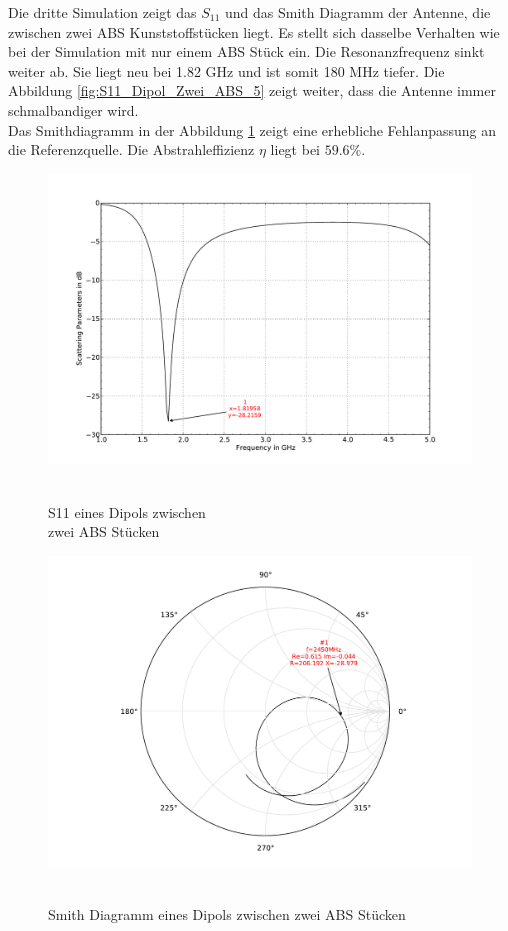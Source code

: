 \newpage
Die dritte Simulation zeigt das $S_{11}$ und das Smith Diagramm der Antenne, die zwischen zwei ABS Kunststoffstücken liegt. Es stellt sich dasselbe Verhalten wie bei der Simulation mit nur einem ABS Stück ein. Die Resonanzfrequenz sinkt weiter ab. Sie liegt neu bei 1.82 GHz und ist somit 180 MHz tiefer. Die Abbildung  \ref{fig:S11_Dipol_Zwei_ABS_5} zeigt weiter, dass die Antenne immer schmalbandiger wird.\\
Das Smithdiagramm in der Abbildung \ref{fig:Smith_Dipol_Zwei_ABS_6} zeigt eine erhebliche Fehlanpassung an die Referenzquelle. Die Abstrahleffizienz $\eta$ liegt  bei $59.6 \%$.

\begin{figure}[!htb]
\begin{center}
  \includegraphics[width=\linewidth]{content/bilder/Evaluation/Dipol/S11DipolZweiABS.pdf}
  \caption{\\S11 eines Dipols zwischen \\zwei ABS Stücken}\label{fig:S11_Dipol_Zwei_ABS_5}
\endminipage%
{}
  \includegraphics[width=\linewidth]{content/bilder/Evaluation/Dipol/SmithDipolZweiABS.pdf}
  \caption{\\Smith Diagramm eines Dipols zwischen zwei ABS Stücken}\label{fig:Smith_Dipol_Zwei_ABS_6}
\endminipage
\end{center}
\end{figure}

